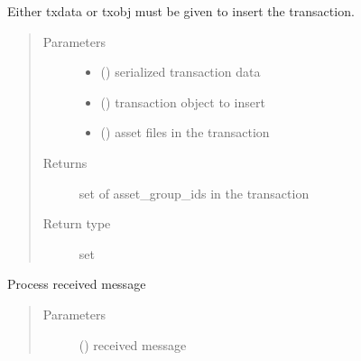 \documentclass[letterpaper,10pt,english]{sphinxmanual}
\begin{document}
\begin{fulllineitems}
\begin{fulllineitems}
Either txdata or txobj must be given to insert the transaction.
\begin{quote}\begin{description}
\item[{Parameters}] \leavevmode\begin{itemize}
\item {} 
 () \textendash{} serialized transaction data

\item {} 
 ({\hyperref[\detokenize{bbc1.core.bbclib:bbc1.core.bbclib.BBcTransaction}]{}}) \textendash{} transaction object to insert

\item {} 
 () \textendash{} asset files in the transaction

\end{itemize}

\item[{Returns}] \leavevmode
set of asset\_group\_ids in the transaction

\item[{Return type}] \leavevmode
set

\end{description}\end{quote}

\end{fulllineitems}


\begin{fulllineitems}
\label{\detokenize{bbc1.core.data_handler:bbc1.core.data_handler.DataHandlerDomain0.process_message}}
Process received message
\begin{quote}\begin{description}
\item[{Parameters}] \leavevmode
{} () \textendash{} received message

\end{description}\end{quote}


\end{fulllineitems}
\end{fulllineitems}
\end{document}
